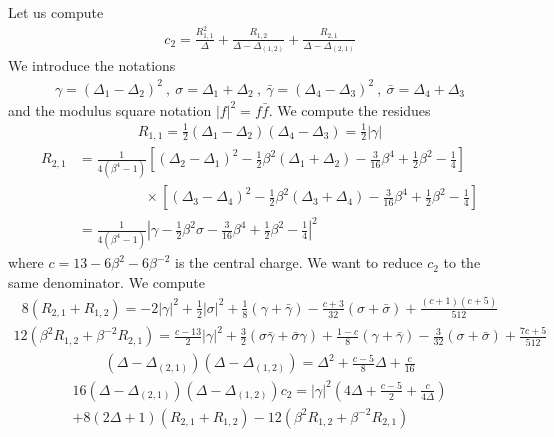\documentclass[12pt,a4paper]{article}
\begin{document}
Let us compute 
\begin{align}
 c_2 = \frac{R_{1,1}^2}{\Delta} +\frac{R_{1,2}}{\Delta-\Delta_{(1,2)}} + \frac{R_{2,1}}{\Delta-\Delta_{(2,1)}}
\end{align}
We introduce the notations 
\begin{align}
 \gamma = (\Delta_1-\Delta_2)^2 \ , \ \sigma = \Delta_1+\Delta_2 \ , \ \bar\gamma = (\Delta_4-\Delta_3)^2 \ , \ \bar\sigma = \Delta_4+\Delta_3 
\end{align}
and the modulus square notation $|f|^2 = f\bar f$. 
We compute the residues 
\begin{align}
 R_{1,1} = \tfrac12 (\Delta_1-\Delta_2)(\Delta_4-\Delta_3)  = \tfrac12 |\gamma| 
 \end{align}
 \begin{align}
   R_{2,1} &= \frac{1}{4(\beta^4-1)}\left[(\Delta_2-\Delta_1)^2 -\tfrac12 \beta^2(\Delta_1+\Delta_2) -\tfrac{3}{16}\beta^4+\tfrac12\beta^2-\tfrac14\right] 
   \\
 & \hspace{2cm} \times \left[(\Delta_3-\Delta_4)^2 -\tfrac12 \beta^2(\Delta_3+\Delta_4) -\tfrac{3}{16}\beta^4+\tfrac12\beta^2-\tfrac14\right] 
 \\
  &= \frac{1}{4(\beta^4-1)}\left|\gamma -\tfrac12 \beta^2 \sigma -\tfrac{3}{16}\beta^4+\tfrac12\beta^2-\tfrac14\right|^2 
 \end{align}
 where $c=13-6\beta^2-6\beta^{-2}$ is the central charge. 
We want to reduce $c_2$ to the same denominator. We compute 
\begin{align}
 8(R_{2,1}+R_{1,2})= -2 |\gamma|^2 +\tfrac{1}{2}|\sigma|^2
 +\tfrac{1}{8} (\gamma+\bar\gamma) -\tfrac{c+3}{32}(\sigma+\bar\sigma) + \tfrac{(c+1)(c+5)}{512}
\end{align}
\begin{align}
 12(\beta^2R_{1,2}+\beta^{-2}R_{2,1}) = \tfrac{c-13}{2}|\gamma|^2 +\tfrac32(\sigma\bar\gamma+\bar\sigma\gamma)+\tfrac{1-c}{8}(\gamma+\bar\gamma) -\tfrac{3}{32}(\sigma+\bar\sigma)+\tfrac{7c+5}{512}
\end{align}
\begin{align}
 (\Delta-\Delta_{(2,1)})(\Delta-\Delta_{(1,2)}) = \Delta^2 + \tfrac{c-5}{8}\Delta + \tfrac{c}{16}
\end{align}
\begin{multline}
 16(\Delta-\Delta_{(2,1)})(\Delta-\Delta_{(1,2)}) c_2 = |\gamma|^2\left(4\Delta + \tfrac{c-5}{2} + \tfrac{c}{4\Delta}\right)
 \\
 +8(2\Delta+1)(R_{2,1}+R_{1,2}) -12(\beta^2R_{1,2}+\beta^{-2}R_{2,1})
\end{multline}
\end{document}
